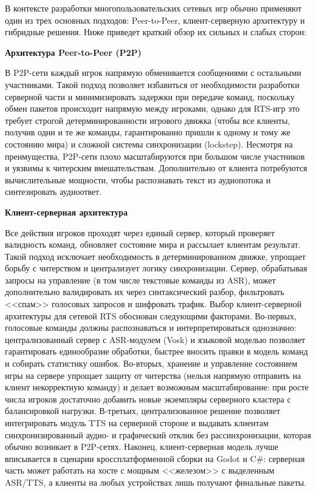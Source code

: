         В контексте разработки многопользовательских сетевых игр обычно применяют один из трех основных подходов: Peer-to-Peer, клиент-серверную архитектуру и гибридные решения. Ниже приведет краткий 
        обзор их сильных и слабых сторон:

        \textbf{Архитектура Peer-to-Peer (P2P)}

        В P2P-сети каждый игрок напрямую обменивается сообщениями с остальными участниками. Такой подход позволяет избавиться от необходимости разработки серверной части 
        и минимизировать задержки при передаче команд, поскольку обмен пакетов происходит напрямую между игроками, однако для RTS-игр это требует строгой детерминированности игрового 
        движка (чтобы все клиенты, получив одни и те же команды, гарантированно пришли к одному и тому же состоянию мира) и сложной системы синхронизации (lockstep). Несмотря на преимущества, 
        P2P-сети плохо масштабируются при большом числе участников и уязвимы к читерским вмешательствам. Дополнительно от клиента потребуются вычислительные мощности, чтобы распознавать текст
        из аудиопотока и синтезировать аудиоответ.
        
        \textbf{Клиент-серверная архитектура}

        Все действия игроков проходят через единый сервер, который проверяет валидность команд, обновляет состояние мира и рассылает клиентам результат. 
        Такой подход исключает необходимость в детерминированном движке, упрощает борьбу с читерством и централизует логику синхронизации. Сервер, обрабатывая запросы на управление 
        (в том числе текстовые команды из ASR), может дополнительно валидировать их через синтаксический разбор, фильтровать <<спам>> голосовых запросов и шифровать трафик. Выбор 
        клиент-серверной архитектуры для сетевой RTS обоснован следующими факторами. Во-первых, голосовые команды должны распознаваться и интерпретироваться однозначно: централизованный 
        сервер с ASR-модулем (Vosk) и языковой моделью позволяет гарантировать единообразие обработки, быстрее вносить правки в модель команд и собирать статистику ошибок. Во-вторых, хранение 
        и управление состоянием игры на сервере упрощает защиту от читерства (нельзя напрямую отправить на клиент некорректную команду) и делает возможным масштабирование: при росте числа игроков 
        достаточно добавить новые экземпляры серверного кластера с балансировкой нагрузки. В-третьих, централизованное решение позволяет интегрировать модуль TTS на серверной стороне 
        и выдавать клиентам синхронизированный аудио- и графический отклик без рассинхронизации, которая обычно возникает в P2P-сетях. Наконец, клиент-серверная модель лучше вписывается 
        в сценарии кроссплатформенной сборки на Godot и C\#: серверная часть может работать на хосте с мощным <<железом>> с выделенным ASR/TTS, а клиенты на любых устройствах лишь получают 
        финальные пакеты.
        
